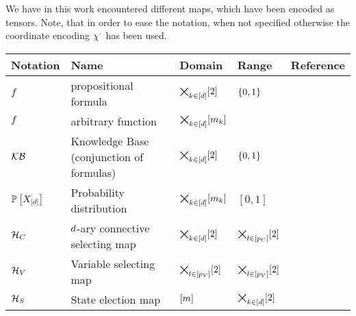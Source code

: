 
We have in this work encountered different maps, which have been encoded as tensors.
Note, that in order to ease the notation, when not specified otherwise the coordinate encoding $\chi^{\cdot}$ has been used.

\begin{center}
\begin{tabular}{l|l|l|l|l}
    \textbf{Notation} & \textbf{Name} & \textbf{Domain} & \textbf{Range} & \textbf{Reference} \\
    \hline
    $f$ & propositional formula & $\bigtimes_{k\in[d]}[2]$ & $\{0,1\}$ & {def:formulas} \\
    $f$ & arbitrary function & $\bigtimes_{k\in[d]}[m_{k}]$ & &   \\
    $\mathcal{KB}$ & Knowledge Base (conjunction of formulas) & $\bigtimes_{k\in[d]}[2]$ & $\{0,1\}$ & \\
    $\mathbb{P}\left[X_{[d]}\right]$ & Probability distribution & $\bigtimes_{k\in[d]}[m_{k}]$ & $[0,1]$ &  {def:probabilityDistribution} \\
    $\mathcal{H}_{C}$ & $d$-ary connective selecting map & $\bigtimes_{k\in[d]}[2]$ & $\bigtimes_{l\in[p_{C}]}[2]$ & {def:connectiveSelector} \\
    $\mathcal{H}_{V}$ & Variable selecting map & $\bigtimes_{l\in[p_{V}]}[2]$ & $\bigtimes_{l\in[p_{V}]}[2]$ & {def:variableSelector} \\ %
    $\mathcal{H}_{S}$ & State election map & $[m]$ & $\bigtimes_{k\in[d]}[2]$ & {def:stateselector} \\
\end{tabular}
\end{center}